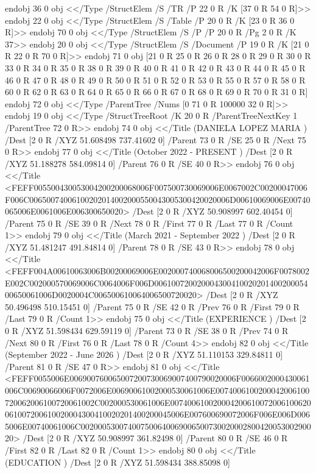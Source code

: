 \documentclass[
  letterpaper,
  DIV=11,
  numbers=noendperiod]{scrartcl}
\begin{document}
{{{{{{{{{{{{{{endobj
36 0 obj
<</Type /StructElem
/S /TR
/P 22 0 R
/K [37 0 R 54 0 R]>>
endobj
22 0 obj
<</Type /StructElem
/S /Table
/P 20 0 R
/K [23 0 R 36 0 R]>>
endobj
70 0 obj
<</Type /StructElem
/S /P
/P 20 0 R
/Pg 2 0 R
/K 37>>
endobj
20 0 obj
<</Type /StructElem
/S /Document
/P 19 0 R
/K [21 0 R 22 0 R 70 0 R]>>
endobj
71 0 obj
[21 0 R 25 0 R 26 0 R 28 0 R 29 0 R 30 0 R 33 0 R 34 0 R 35 0 R 38 0 R 39 0 R 40 0 R 41 0 R 42 0 R 43 0 R 44 0 R 45 0 R 46 0 R 47 0 R 48 0 R 49 0 R 50 0 R 51 0 R 52 0 R 53 0 R 55 0 R 57 0 R 58 0 R 60 0 R 62 0 R 63 0 R 64 0 R 65 0 R 66 0 R 67 0 R 68 0 R 69 0 R 70 0 R 31 0 R]
endobj
72 0 obj
<</Type /ParentTree
/Nums [0 71 0 R 100000 32 0 R]>>
endobj
19 0 obj
<</Type /StructTreeRoot
/K 20 0 R
/ParentTreeNextKey 1
/ParentTree 72 0 R>>
endobj
74 0 obj
<</Title (DANIELA LOPEZ MARIA )
/Dest [2 0 R /XYZ 51.608498 737.41602 0]
/Parent 73 0 R
/SE 25 0 R
/Next 75 0 R>>
endobj
77 0 obj
<</Title (October 2022 - PRESENT )
/Dest [2 0 R /XYZ 51.188278 584.09814 0]
/Parent 76 0 R
/SE 40 0 R>>
endobj
76 0 obj
<</Title <FEFF005500430053004200200068006F007500730069006E0067002C00200047006F006C00650074006100202014002000550043005300420020006D00610069006E00740065006E0061006E006300650020>
/Dest [2 0 R /XYZ 50.908997 602.40454 0]
/Parent 75 0 R
/SE 39 0 R
/Next 78 0 R
/First 77 0 R
/Last 77 0 R
/Count 1>>
endobj
79 0 obj
<</Title (March 2021 - September 2022 )
/Dest [2 0 R /XYZ 51.481247 491.84814 0]
/Parent 78 0 R
/SE 43 0 R>>
endobj
78 0 obj
<</Title <FEFF004A00610063006B00200069006E002000740068006500200042006F0078002E002C002000570069006C0064006F006D00610072002000430041002020140020005400650061006D0020004C006500610064006500720020>
/Dest [2 0 R /XYZ 50.496498 510.15451 0]
/Parent 75 0 R
/SE 42 0 R
/Prev 76 0 R
/First 79 0 R
/Last 79 0 R
/Count 1>>
endobj
75 0 obj
<</Title (EXPERIENCE )
/Dest [2 0 R /XYZ 51.598434 629.59119 0]
/Parent 73 0 R
/SE 38 0 R
/Prev 74 0 R
/Next 80 0 R
/First 76 0 R
/Last 78 0 R
/Count 4>>
endobj
82 0 obj
<</Title (September 2022 - June 2026 )
/Dest [2 0 R /XYZ 51.110153 329.84811 0]
/Parent 81 0 R
/SE 47 0 R>>
endobj
81 0 obj
<</Title <FEFF0055006E006900760065007200730069007400790020006F0066002000430061006C00690066006F0072006E00690061002000530061006E0074006100200042006100720062006100720061002C002000530061006E007400610020004200610072006100620061007200610020004300410020201400200045006E007600690072006F006E006D0065006E00740061006C00200053007400750064006900650073002000280042005300290020>
/Dest [2 0 R /XYZ 50.908997 361.82498 0]
/Parent 80 0 R
/SE 46 0 R
/First 82 0 R
/Last 82 0 R
/Count 1>>
endobj
80 0 obj
<</Title (EDUCATION )
/Dest [2 0 R /XYZ 51.598434 388.85098 0]
}}}}}}}}}}}}}}
\end{document}

